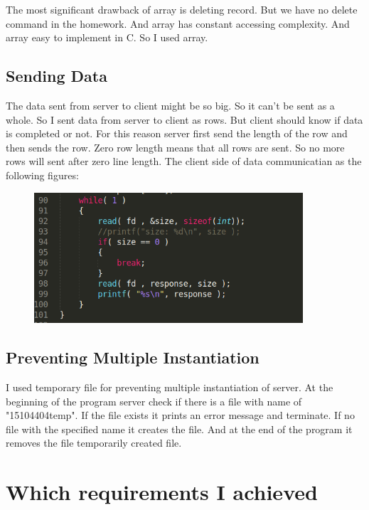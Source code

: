\documentclass[10pt,english, openany]{book}
\begin{document}
The most significant drawback of array is deleting record. But we have no delete command in the homework. And array has constant accessing complexity. And array easy to implement in C. So I used array.

\subsection{ Sending Data }
The data sent from server to client might be so big. So it can't be sent as a whole. So I sent data from server to client as rows. But client should know if data is completed or not. For this reason server first send the length of the row and then sends the row. Zero row length means that all rows are sent. So no more rows will sent after zero line length.
\newline
The client side of data communicatian as the following figures:

\vspace{0.5cm}

\begin{figure}[htp]
    \centering
    \includegraphics[width=10cm]{send_data.PNG}
    
\end{figure}

\subsection{ Preventing Multiple Instantiation }
I used temporary file for preventing multiple instantiation of server. At the beginning of the program server check if there is a file with name of "15104404\textunderscore temp". If the file exists it prints an error message and terminate. If no file with the specified name it creates the file. And at the end of the program it removes the file temporarily created file.




\section{Which requirements I achieved}
\end{document}
